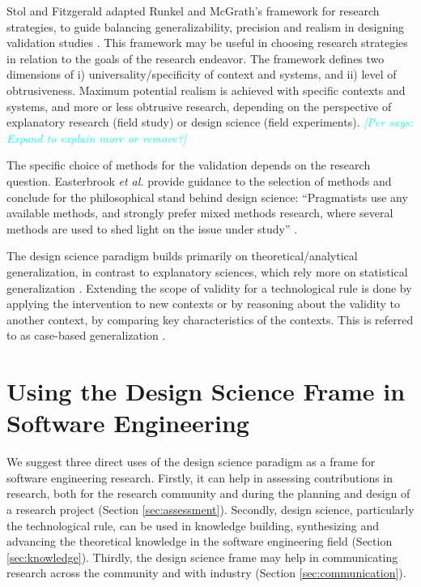 \documentclass[graybox]{svmult}
\newcommand{\per}[1]{\textcolor{cyan}{{\it [Per says: #1]}}}
\newcommand{\per}[1]{}
\begin{document}
{Stol and Fitzgerald adapted Runkel and McGrath's framework for research strategies, to guide balancing generalizability, precision and realism in designing validation studies \cite{StolABC18}. This framework may be useful in choosing research strategies in relation to the goals of the research endeavor. The framework defines two dimensions of i) universality/specificity of context and systems, and ii) level of obtrusiveness. Maximum potential realism is achieved with specific contexts and systems, and more or less obtrusive research, depending on the perspective of explanatory research (field study) or design science (field experiments). \per{Expand to explain more or remove?} 

The specific choice of methods for the validation depends on the research question. Easterbrook \emph{et al.} provide guidance to the selection of methods and conclude for the philosophical stand behind design science: ``Pragmatists use any available methods, and strongly prefer mixed methods research, where several methods are used to shed light on the issue under study'' \cite{easterbrook_selecting_2008}.

The design science paradigm builds primarily on theoretical/analytical generalization, in contrast to explanatory sciences, which rely more on statistical generalization \cite[p. 30]{Runeson12Case}. Extending the scope of validity for a technological rule is done by applying the intervention to new contexts or by reasoning about the validity to another context, by comparing key characteristics of the contexts. This is referred to as case-based generalization \cite{Wieringa2015}. 


\section{Using the Design Science Frame in Software Engineering}
We suggest three direct uses of the design science paradigm as a frame for software engineering research. Firstly, it can help in assessing contributions in research, both for the research community and during the planning and design of a research project (Section \ref{sec:assessment}). Secondly, design science, particularly the technological rule, can be used in knowledge building, synthesizing and advancing the theoretical knowledge in the software engineering field (Section \ref{sec:knowledge}). Thirdly, the design science frame may help in communicating research across the community and with industry (Section \ref{sec:communication}).

}
\end{document}
